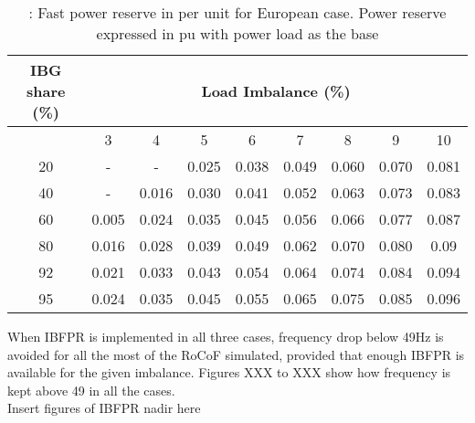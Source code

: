 \begin{table}[h]
	\caption{\label{tb:crpowr}: Fast power reserve in per unit for European case. Power reserve expressed in pu with power load as the base}
	\centering
	\begin{tabular}{*9c}
		\toprule
		\textbf{IBG share (\%)}	& \multicolumn{8}{c}{\textbf{Load Imbalance (\%)}} \\
		\midrule
		{} & 3&	4&	5&	6&	7&	8&	9	&10 \\
		\midrule
		20&	-&	-&	0.025&	0.038&	0.049&	0.060&	0.070&	0.081\\
		40&	-&	0.016&	0.030&	0.041&	0.052&	0.063&	0.073&	0.083\\
		60&	0.005&	0.024&	0.035&	0.045&	0.056&	0.066&	0.077&	0.087\\
		80&	0.016&	0.028&	0.039&	0.049&	0.062&	0.070&	0.080&	0.09\\
		92&	0.021&	0.033&	0.043&	0.054&	0.064&	0.074&	0.084&	0.094\\
		95&	0.024&	0.035&	0.045&	0.055&	0.065&	0.075&	0.085&	0.096\\
		\bottomrule
	\end{tabular}
\end{table}

When IBFPR is implemented in all three cases, frequency drop below 49Hz is avoided for all the most of the RoCoF simulated, provided that enough IBFPR is available for the given imbalance. Figures XXX to XXX show how frequency is kept above 49 in all the cases.\\

Insert figures of IBFPR nadir here\\


